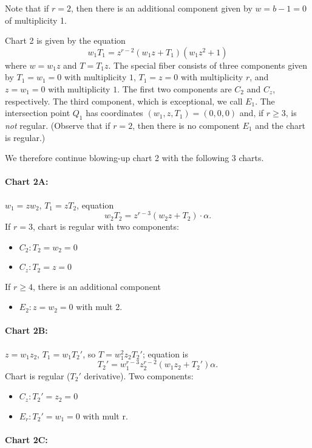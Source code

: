 \documentclass{article}
\theoremstyle{plain}
\theoremstyle{definition}
\theoremstyle{remark}
\begin{document}
Note that if $r = 2$, then there is an additional component given by $w = b - 1 = 0$ of multiplicity 1.

Chart 2 is given by the equation
\[
w_1 T_1 = z^{r-2}(w_1z + T_1)(w_1 z^2 + 1)
\]
where $w = w_1 z$ and $T = T_1 z$. The special fiber consists of three components given by $T_1 = w_1 = 0$ with multiplicity $1$, $T_1 = z = 0$ with multiplicity $r$, and $z = w_1 = 0$ with multiplicity $1$. The first two components are $C_2$ and $C_z$, respectively. The third component, which is exceptional, we call $E_1$. The intersection point $Q_1$ has coordinates $(w_1, z, T_1) = (0,0,0)$ and, if $r \geq 3$, is \emph{not} regular. (Observe that if $r = 2$, then there is no component $E_1$ and the chart is regular.)

We therefore continue blowing-up chart 2 with the following 3 charts.

\paragraph{Chart 2A:}
\label{sec:chart-a}

$w_1 = z w_2$, $T_1 = z T_2$, equation 
\[
w_2T_2 = z^{r-3}(w_2 z + T_2) \cdot \alpha.
\]
If $r = 3$, chart is regular with two components:
\begin{itemize}
    \item $C_2: T_2 = w_2 = 0$
    \item $C_z: T_2 = z = 0$
\end{itemize}
If $r \geq 4$, there is an additional component
\begin{itemize}
    \item $E_2: z = w_2 = 0$ with mult 2.
\end{itemize}

\paragraph{Chart 2B:}
\label{sec:chart-b}

$z = w_1 z_2$, $T_1 = w_1 T_2'$, so $T = w_1^2 z_2 T_2'$; equation is
\[
T_2' = w_1^{r-3} z_2^{r-2} (w_1z_2 + T_2') \alpha.
\]
Chart is regular ($T_2'$ derivative). Two components:
\begin{itemize}
    \item $C_z: T_2' = z_2 = 0$
    \item $E_r: T_2' = w_1 = 0$ with mult r.
\end{itemize}

\paragraph{Chart 2C:}
\label{sec:chart-c}
\end{document}
